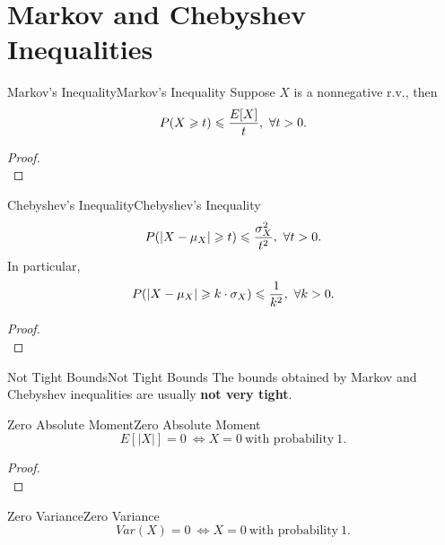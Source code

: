 \documentclass{elegantbook}
\begin{document}
\section{Markov and Chebyshev Inequalities}

\begin{theorem}{Markov's Inequality}{Markov's Inequality}
Suppose \(X\) is a nonnegative r.v., then
\[P(X \geqslant t) \leqslant \frac{E[X]}{t},\ \forall t > 0.\]
\end{theorem}

\begin{proof}
\\[4cm]\vspace{0.01cm}
\end{proof}

\begin{theorem}{Chebyshev's Inequality}{Chebyshev's Inequality}
\[P( \left| X - \mu_{X} \right| \geqslant t ) \leqslant \frac{\sigma_{X}^{2}}{t^{2}},\ \forall t > 0.\]
In particular,
\[P(\left| X - \mu_{X} \right| \geqslant k \cdot \sigma_{X}) \leqslant \frac{1}{k^{2}},\ \forall k > 0.\]
\end{theorem}

\begin{proof}
\\[4cm]\vspace{0.01cm}
\end{proof}

\begin{remark}{Not Tight Bounds}{Not Tight Bounds}
The bounds obtained by Markov and Chebyshev inequalities are usually
\textbf{not very tight}.\\
\vspace{0.01cm}
\end{remark}

\begin{theorem}{Zero Absolute Moment}{Zero Absolute Moment}
\[E[\left| X \right|] = 0\  \Leftrightarrow X = 0\ \mathrm{\text{with\ probability}}\ 1.\]
\end{theorem}

\begin{proof}
\\[4cm]\vspace{0.01cm}
\end{proof}

\begin{corollary}{Zero Variance}{Zero Variance}
\[Var(X) = 0\  \Leftrightarrow X = 0\ \mathrm{\text{with\ probability}}\ 1.\]
\end{corollary}
\end{document}
